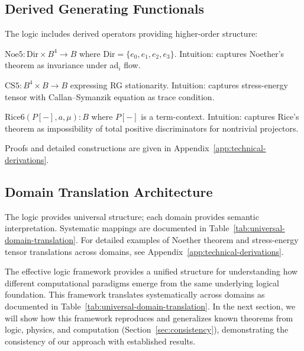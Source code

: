 \subsection{Derived Generating Functionals}

The logic includes derived operators providing higher-order structure:

\begin{definition}
\label{def:noe5}
$\text{Noe5}: \text{Dir} \times B^4 \to B$ where $\text{Dir} = \{e_0, e_1, e_2, e_3\}$. Intuition: captures Noether's theorem \cite{noether1918} as invariance under ad$_i$ flow.
\end{definition}

\begin{definition}
\label{def:cs5}
$\text{CS5}: B^4 \times B \to B$ expressing RG stationarity. Intuition: captures stress-energy tensor with Callan–Symanzik equation as trace condition.
\end{definition}

\begin{definition}
\label{def:rice6}
$\text{Rice6}(P[-], a, \mu): B$ where $P[-]$ is a term-context. Intuition: captures Rice's theorem \cite{rice1953} as impossibility of total positive discriminators for nontrivial projectors.
\end{definition}

Proofs and detailed constructions are given in Appendix~\ref{app:technical-derivations}.

\subsection{Domain Translation Architecture}

The logic provides universal structure; each domain provides semantic interpretation. Systematic mappings are documented in Table~\ref{tab:universal-domain-translation}. For detailed examples of Noether theorem and stress-energy tensor translations across domains, see Appendix~\ref{app:technical-derivations}.

The effective logic framework provides a unified structure for understanding how different computational paradigms emerge from the same underlying logical foundation. This framework translates systematically across domains as documented in Table~\ref{tab:universal-domain-translation}. In the next section, we will show how this framework reproduces and generalizes known theorems from logic, physics, and computation (Section~\ref{sec:consistency}), demonstrating the consistency of our approach with established results.
